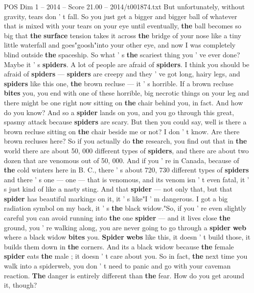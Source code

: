 \begin{textsample}{POS Dim 1 – 2014 – Score 21.00 – 2014/t001874.txt}
But unfortunately, without gravity, tears don ' t fall.
So you just get a bigger and bigger ball of whatever that is mixed with your tears on your eye until eventually, \textbf{the} ball becomes so big that \textbf{the} \textbf{surface} tension takes it across \textbf{the} bridge of your nose like a tiny little waterfall and goes"goosh"into your other eye, and now I was completely blind outside \textbf{the} spaceship.
So what ' s \textbf{the} scariest thing you ' ve ever done?
Maybe it ' s \textbf{spiders}.
A lot of people are afraid of \textbf{spiders}.
I think you should be afraid of \textbf{spiders} — \textbf{spiders} are creepy and they ' ve got long, hairy legs, and \textbf{spiders} like this one, \textbf{the} brown recluse — it ' s horrible.
If a brown recluse \textbf{bites} you, you end with one of these horrible, big necrotic things on your leg and there might be one right now sitting on \textbf{the} chair behind you, in fact.
And how do you know?
And so a \textbf{spider} lands on you, and you go through this great, spasmy attack because \textbf{spiders} are scary.
But then you could say, well is there a brown recluse sitting on \textbf{the} chair beside me or not?
I don ' t know.
Are there brown recluses here?
So if you actually do \textbf{the} research, you find out that in \textbf{the} world there are about 50, 000 different types of \textbf{spiders}, and there are about two dozen that are venomous out of 50, 000.
And if you ' re in Canada, because of \textbf{the} cold winters here in B.
C., there ' s about 720, 730 different types of \textbf{spiders} and there ' s one — one — that is venomous, and its venom isn ' t even fatal, it ' s just kind of like a nasty sting.
And that \textbf{spider} — not only that, but that \textbf{spider} has beautiful markings on it, it ' s like"I ' m dangerous.
I got a big radiation symbol on my back, it ' s \textbf{the} black widow."So, if you ' re even slightly careful you can avoid running into \textbf{the} one \textbf{spider} — and it lives close \textbf{the} ground, you ' re walking along, you are never going to go through a \textbf{spider} \textbf{web} where a black widow \textbf{bites} you. \textbf{Spider} \textbf{webs} like this, it doesn ' t build those, it builds them down in \textbf{the} corners.
And its a black widow because \textbf{the} female \textbf{spider} eats \textbf{the} male ; it doesn ' t care about you.
So in fact, \textbf{the} next time you walk into a spiderweb, you don ' t need to panic and go with your caveman reaction. \textbf{The} danger is entirely different than \textbf{the} fear.
How do you get around it, though?

\end{textsample}

